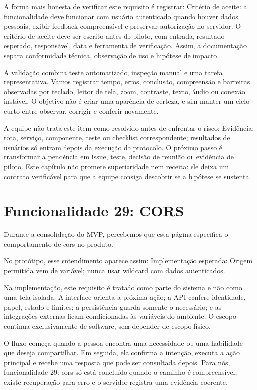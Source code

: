 \documentclass[12pt,oneside,a4paper,article]{abntex2}
\begin{document}
A forma mais honesta de verificar este requisito é registrar: Critério de aceite: a funcionalidade deve funcionar com usuário autenticado quando houver dados pessoais, exibir feedback compreensível e preservar autorização no servidor. O critério de aceite deve ser escrito antes do piloto, com entrada, resultado esperado, responsável, data e ferramenta de verificação. Assim, a documentação separa conformidade técnica, observação de uso e hipótese de impacto.

A validação combina teste automatizado, inspeção manual e uma tarefa representativa. Vamos registrar tempo, erros, conclusão, compreensão e barreiras observadas por teclado, leitor de tela, zoom, contraste, texto, áudio ou conexão instável. O objetivo não é criar uma aparência de certeza, e sim manter um ciclo curto entre observar, corrigir e conferir novamente.

A equipe não trata este item como resolvido antes de enfrentar o risco: Evidência: rota, serviço, componente, teste ou checklist correspondente; resultados de usuários só entram depois da execução do protocolo. O próximo passo é transformar a pendência em issue, teste, decisão de reunião ou evidência de piloto. Este capítulo não promete superioridade nem receita: ele deixa um contrato verificável para que a equipe consiga descobrir se a hipótese se sustenta.

\section{Funcionalidade 29: CORS}
Durante a consolidação do MVP, percebemos que esta página especifica o comportamento de cors no produto.

No protótipo, esse entendimento aparece assim: Implementação esperada: Origem permitida vem de variável; nunca usar wildcard com dados autenticados.

Na implementação, este requisito é tratado como parte do sistema e não como uma tela isolada. A interface orienta a próxima ação; a API confere identidade, papel, estado e limites; a persistência guarda somente o necessário; e as integrações externas ficam condicionadas às variáveis do ambiente. O escopo continua exclusivamente de software, sem depender de escopo físico.

O fluxo começa quando a pessoa encontra uma necessidade ou uma habilidade que deseja compartilhar. Em seguida, ela confirma a intenção, executa a ação principal e recebe uma resposta que pode ser consultada depois. Para nós, funcionalidade 29: cors só está concluído quando o caminho é compreensível, existe recuperação para erro e o servidor registra uma evidência coerente.
\end{document}

